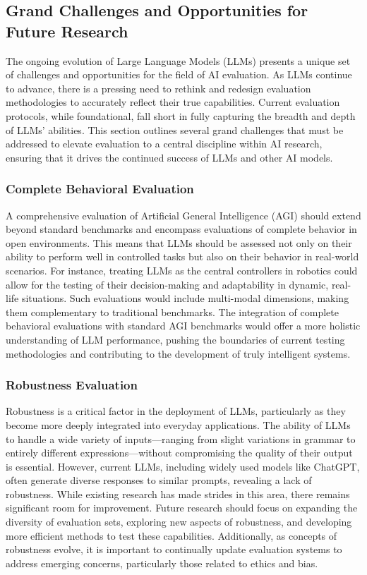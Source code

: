 \subsection{Grand Challenges and Opportunities for Future Research}

The ongoing evolution of Large Language Models (LLMs) presents a unique set of challenges and opportunities for the field of AI evaluation. As LLMs continue to advance, there is a pressing need to rethink and redesign evaluation methodologies to accurately reflect their true capabilities. Current evaluation protocols, while foundational, fall short in fully capturing the breadth and depth of LLMs' abilities. This section outlines several grand challenges that must be addressed to elevate evaluation to a central discipline within AI research, ensuring that it drives the continued success of LLMs and other AI models.

\subsubsection{Complete Behavioral Evaluation}

A comprehensive evaluation of Artificial General Intelligence (AGI) should extend beyond standard benchmarks and encompass evaluations of complete behavior in open environments. This means that LLMs should be assessed not only on their ability to perform well in controlled tasks but also on their behavior in real-world scenarios. For instance, treating LLMs as the central controllers in robotics could allow for the testing of their decision-making and adaptability in dynamic, real-life situations. Such evaluations would include multi-modal dimensions, making them complementary to traditional benchmarks. The integration of complete behavioral evaluations with standard AGI benchmarks would offer a more holistic understanding of LLM performance, pushing the boundaries of current testing methodologies and contributing to the development of truly intelligent systems.

\subsubsection{Robustness Evaluation}

Robustness is a critical factor in the deployment of LLMs, particularly as they become more deeply integrated into everyday applications. The ability of LLMs to handle a wide variety of inputs—ranging from slight variations in grammar to entirely different expressions—without compromising the quality of their output is essential. However, current LLMs, including widely used models like ChatGPT, often generate diverse responses to similar prompts, revealing a lack of robustness. While existing research has made strides in this area, there remains significant room for improvement. Future research should focus on expanding the diversity of evaluation sets, exploring new aspects of robustness, and developing more efficient methods to test these capabilities. Additionally, as concepts of robustness evolve, it is important to continually update evaluation systems to address emerging concerns, particularly those related to ethics and bias.

